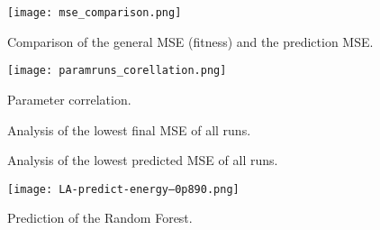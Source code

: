 \documentclass[conference]{IEEEtran}
\begin{document}
\begin{figure}[!t] 
\centering 
\texttt{[image: mse\_comparison.png]} 
\caption{Comparison of the general MSE (fitness) and the prediction MSE.} 
\label{fig:mse_comparison} 
\end{figure}

\begin{figure}[!t] 
\centering 
\texttt{[image: paramruns\_corellation.png]} 
\caption{Parameter correlation.} 
\label{fig:param_correlation} 
\end{figure}

\begin{figure*}[!t]
\centerline{
\hfil
{}}
\caption{Analysis of the lowest final MSE of all runs.}
\label{fig:winner}
\end{figure*}


\begin{figure*}[!t]
\centerline{
\hfil
{}}
\caption{Analysis of the lowest predicted MSE of all runs.}
\label{fig:best}
\end{figure*}


\begin{figure}[!t] 
\centering 
\texttt{[image: LA-predict-energy--0p890.png]} 
\caption{Prediction of the Random Forest.} 
\label{fig:random_forest} 
\end{figure}


%
\end{document}
